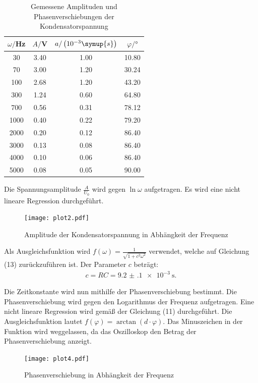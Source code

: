 \begin{table}[H]
  \centering
  \caption{Gemessene Amplituden und Phasenverschiebungen der Kondensatorspannung}
  \label{tab:amplitude}
  \begin{tabular}{c c c c}
    \toprule
    $\omega/$Hz & $A/$V & $a/\left(10^{-3}\symup{s}\right)$ & $\varphi /°$ \\
    \midrule
    30   &  3.40 &    1.00 &  10.80 \\
    70   &  3.00 &    1.20 &  30.24 \\
    100  &  2.68 &    1.20 &  43.20 \\
    300  &  1.24 &    0.60 &  64.80 \\
    700  &  0.56 &    0.31 &  78.12 \\
    1000 &  0.40 &    0.22 &  79.20 \\
    2000 &  0.20 &    0.12 &  86.40 \\
    3000 &  0.13 &    0.08 &  86.40 \\
    4000 &  0.10 &    0.06 &  86.40 \\
    5000 &  0.08 &    0.05 &  90.00 \\
    \bottomrule
  \end{tabular}
\end{table}

Die Spannungsamplitude $\frac{A}{U_0}$ wird gegen $\ln{\omega}$ aufgetragen. Es wird eine nicht lineare
Regression durchgeführt.

\begin{figure}[H]
  \centering
  \texttt{[image: plot2.pdf]}
  \caption{Amplitude der Kondensatorspannung in Abhängkeit der Frequenz}
  \label{fig:amplitude}
\end{figure}

Als Ausgleichsfunktion wird $f(\omega) = \frac{1}{\sqrt{1 + c^2 \omega^2}}$ verwendet, welche auf Gleichung (13)
zurückzuführen ist.
Der Parameter $c$ beträgt:
\begin{align*}
  c = RC = \SI{9.2(1)e-3}{\second}.
\end{align*}

Die Zeitkonstante wird nun mithilfe der Phasenverschiebung bestimmt. Die Phasenverschiebung wird gegen
den Logarithmus der Frequenz aufgetragen. Eine nicht lineare Regression wird gemäß der Gleichung (11) durchgeführt.
Die Ausgleichsfunktion lautet $f(\varphi) = \arctan(d \cdot \varphi)$. Das Minuszeichen in der Funktion wird
weggelassen, da das Oszilloskop den Betrag der Phasenverschiebung anzeigt.

\begin{figure}[H]
  \centering
  \texttt{[image: plot4.pdf]}
  \caption{Phasenverschiebung in Abhängkeit der Frequenz}
  \label{fig:phasenverschiebung}
\end{figure}

